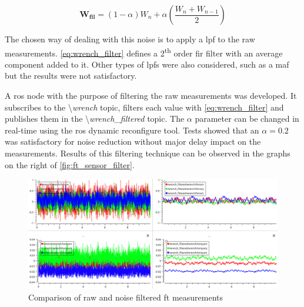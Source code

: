 \begin{equation}
    \mathbf{W_{fil}} = (1-\alpha)W_n + \alpha \left(\frac{W_n + W_{n-1}}{2}\right)
    \label{eq:wrench_filter}
\end{equation}


\par The chosen way of dealing with this noise is to apply a \ac{lpf} to the raw measurements. \autoref{eq:wrench_filter} defines a 2\textsuperscript{th} order \ac{fir} filter with an average component added to it. Other types of \acp{lpf} were also considered, such as a \ac{maf} but the results were not satisfactory.

\par A \ac{ros} node with the purpose of filtering the raw measurements was developed. It subscribes to the \textbackslash \textit{wrench} topic, filters each value with \autoref{eq:wrench_filter} and publishes them in the \textbackslash \textit{wrench\_filtered} topic. The $\alpha$ parameter can be changed in real-time using the \ac{ros} dynamic reconfigure tool. Tests showed that an $\alpha = 0.2 $ was satisfactory for noise reduction without major delay impact on the measurements. Results of this filtering technique can be observed in the graphs on the right of \autoref{fig:ft_sensor_filter}.

\begin{figure}[h]
    \centering
    \includegraphics[width=0.9\linewidth]{figs/chp3/ft_sensor_filter.png}
    \caption{Comparison of raw and noise filtered \ac{ft} measurements}
    \label{fig:ft_sensor_filter}
\end{figure}


